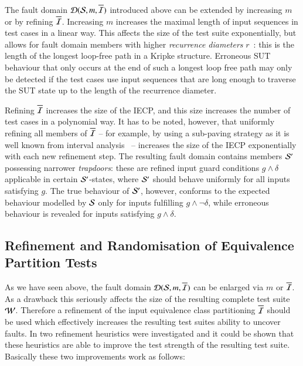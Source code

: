 The fault domain ${\cal D}({\cal S},m,\overline{{\cal I}})$ introduced above
can be extended by increasing $m$ or by refining $\overline{{\cal I}}$. Increasing
$m$ increases the maximal length of input sequences in test cases in a linear way.
This affects the size of the test suite exponentially, 
but allows for fault domain members with 
higher \emph{recurrence diameters} $r$~\cite{biere_linear_2006}: 
this is the length of the longest loop-free path in
a Kripke structure. Erroneous SUT behaviour that only occurs at the end of such a longest loop 
free path may only be detected if the test cases use input sequences that are long enough
to traverse the SUT state up to the length of the recurrence diameter. 

Refining $\overline{{\cal I}}$ increases the size of the IECP, and this size 
increases the number of test cases in a polynomial way. It has to be noted, however,
that uniformly refining all members of $\overline{{\cal I}}$ -- for example, by using 
a sub-paving strategy as it is well known from interval analysis~\cite{jaulin2001} -- increases the size of the IECP exponentially with each new refinement step. 
The resulting fault domain contains members ${\cal S}'$ 
possessing narrower \emph{trapdoors}: these
are refined input guard conditions $g\wedge \delta$ applicable in certain ${\cal S}'$-states,
where  ${\cal S}'$ should behave uniformly for all inputs satisfying $g$. 
The true behaviour of ${\cal S}'$, however, 
conforms to the expected behaviour modelled by ${\cal S}$ only for inputs
fulfilling $g\wedge \neg\delta$, while   erroneous behaviour is revealed for inputs 
satisfying $g\wedge \delta$.

\subsection{Refinement and Randomisation of Equivalence Partition Tests}\label{sec:ecpt:refinement}

As we have seen above, the fault domain ${\cal D}({\cal S},m,\overline{{\cal I}})$ can be enlarged
via $m$ or $\overline{{\cal I}}$. As a drawback this seriously affects the size of the
resulting complete test suite ${\cal W}$. Therefore a refinement of the input equivalence 
class partitioning $\overline{{\cal I}}$ should be used which effectively increases the resulting 
test suites ability to uncover faults. In \cite{huebner15} two refinement heuristics were investigated and it could be
shown that these heuristics are able to improve the test strength of the resulting test suite.
Basically these two improvements work as follows:

